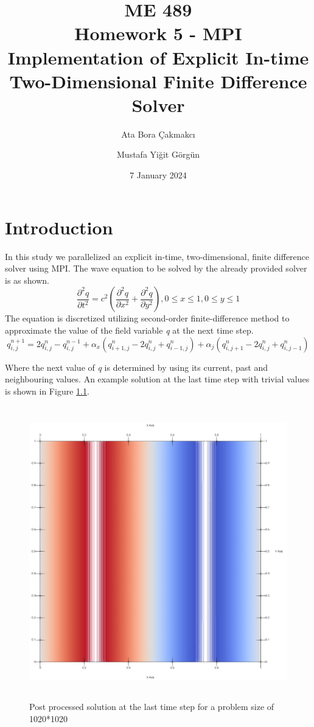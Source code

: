 \documentclass{report}
\title{ME 489\\ Homework 5 - MPI Implementation of Explicit In-time Two-Dimensional Finite Difference Solver}
\author{Ata Bora Çakmakcı}
\author{Mustafa Yiğit Görgün}
\affil{Middle East Technical University}
\date{7 January 2024}
\begin{document}
\maketitle
\tableofcontents
\chapter{Introduction}
In this study we parallelized an explicit in-time, two-dimensional, finite
difference solver using MPI. The wave equation to be solved by the already provided solver is as shown.
$$
\frac{\partial^2 q}{\partial t^2}=c^2\left(\frac{\partial^2 q}{\partial x^2}+\frac{\partial^2 q}{\partial y^2}\right), 0 \leq x \leq 1,0 \leq y \leq 1
$$
The equation is discretized utilizing second-order finite-difference method to approximate the value of the field variable \emph{q} at the next time step.
$$
q_{i, j}^{n+1}=2 q_{i, j}^n-q_{i, j}^{n-1}+\alpha_x\left(q_{i+1, j}^n-2 q_{i, j}^n+q_{i-1, j}^n\right)+\alpha_j\left(q_{i, j+1}^n-2 q_{i, j}^n+q_{i, j-1}^n\right)
$$

Where the next value of \emph{q} is determined by using its current, past and neighbouring values. An example solution at the last time step with trivial values is shown in Figure \ref{fig:1020_10}.
\begin{figure}[h]
    \centering
    \includegraphics[height=5in,width=5in,angle=0]{figures/MPI_1020_10.png}
    \caption{Post processed solution at the last time step for a problem size of 1020*1020}
    \label{fig:1020_10}
\end{figure}
\end{document}
